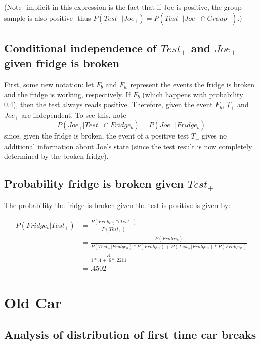 \documentclass[paper=a4, fontsize=11pt]{scrartcl} %
\numberwithin{equation}{section} %
\numberwithin{figure}{section} %
\numberwithin{table}{section} %
\begin{document}
(Note- implicit in this expression is the fact that if Joe is positive, the group sample is also positive- thus $P(Test_+ | Joe_+) = P(Test_+ | Joe_+ \cap Group_+)$.)

\subsection{Conditional independence of $Test_+$ and $Joe_+$ given fridge is broken}

First, some new notation: let $F_b$ and $F_w$ represent the events the fridge is broken and the fridge is working, respectively. If $F_b$ (which happens with probability 0.4), then the test always reads positive. Therefore, given the event $F_b$, $T_+$ and $Joe_+$ are independent. To see this, note
\begin{equation*}
P(Joe_+ | Test_+ \cap Fridge_b) = P(Joe_+ | Fridge_b)
\end{equation*}
since, given the fridge is broken, the event of a positive test $T_+$ gives no additional information about Joe's state (since the test result is now completely determined by the broken fridge).

\subsection{Probability fridge is broken given $Test_+$ }

The probability the fridge is broken given the test is positive is given by:

\begin{align*}
P(Fridge_b | Test_+)& = \frac{P(Fridge_b \cap Test_+)}{P(Test_+)}\\
   & = \frac{P(Fridge_b)}{P(Test_+ | Fridge_b)*P(Fridge_b) + P(Test_+ | Fridge_w)*P(Fridge_w)}\\
   & = \frac{.4}{1*.4+.6 * .2211}\\
   & = .4502
\end{align*}

\section{Old Car}

\subsection{Analysis of distribution of first time car breaks}
\end{document}
